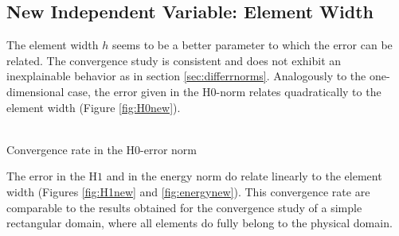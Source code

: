 \documentclass[a4paper,12pt]{article}
\makeatletter
\newenvironment{figurehere}
  {\def\@captype{figure}}
  {}
\makeatother
\begin{document}
\subsection{New Independent Variable: Element Width}
The element width $h$ seems to be a better parameter to which the error can be related. The convergence study is consistent and does not exhibit an inexplainable behavior as in section \ref{sec:differrnorms}. Analogously to the one-dimensional case, the error given in the H$0$-norm relates quadratically to the element width (Figure \ref{fig:H0new}).
\begin{center}
\begin{figurehere}
\\
\caption{Convergence rate in the H0-error norm}\label{fig:H0new}
\end{figurehere}
\end{center}
The error in the H$1$ and in the energy norm do relate linearly to the element width (Figures \ref{fig:H1new} and \ref{fig:energynew}). This convergence rate are comparable to the results obtained for the convergence study of a simple rectangular domain, where all elements do fully belong to the physical domain.
\end{document}

